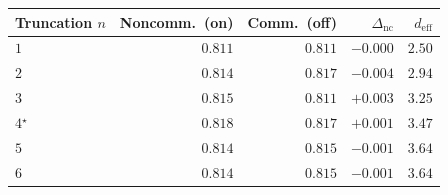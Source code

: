 \begin{tabular}{lrrrr}
\toprule
Truncation $n$ & Noncomm.\ (on) & Comm.\ (off) & $\Delta_{\mathrm{nc}}$ & $d_{\mathrm{eff}}$ \\
\midrule
$1$ & $0.811$ & $0.811$ & $-0.000$ & $2.50$ \\
$2$ & $0.814$ & $0.817$ & $-0.004$ & $2.94$ \\
$3$ & $0.815$ & $0.811$ & $+0.003$ & $3.25$ \\
$4$$^{\star}$ & $0.818$ & $0.817$ & $+0.001$ & $3.47$ \\
$5$ & $0.814$ & $0.815$ & $-0.001$ & $3.64$ \\
$6$ & $0.814$ & $0.815$ & $-0.001$ & $3.64$ \\
\bottomrule
\end{tabular}
